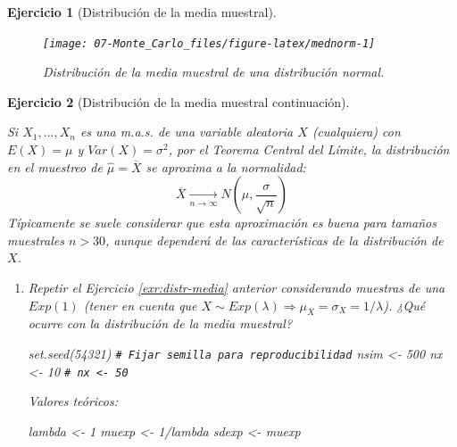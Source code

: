 \documentclass[
]{book}
\newenvironment{Shaded}{\begin{snugshade}}{\end{snugshade}}
\newcommand{\CommentTok}[1]{\textcolor[rgb]{0.56,0.35,0.01}{\textit{#1}}}
\newcommand{\DecValTok}[1]{\textcolor[rgb]{0.00,0.00,0.81}{#1}}
\newcommand{\FunctionTok}[1]{\textcolor[rgb]{0.00,0.00,0.00}{#1}}
\newcommand{\NormalTok}[1]{#1}
\newcommand{\OtherTok}[1]{\textcolor[rgb]{0.56,0.35,0.01}{#1}}
\newcommand{\SpecialCharTok}[1]{\textcolor[rgb]{0.00,0.00,0.00}{#1}}
\theoremstyle{break}
\newtheorem{exercise}{Ejercicio}[chapter]
\theoremstyle{nonumberplain}
\renewcommand{\CommentTok}[1]{\textcolor[rgb]{0.41,0.41,0.41}{\texttt{#1}}}
\begin{document}
\begin{exercise}[Distribución de la media muestral]
\begin{enumerate}
  \begin{figure}[!htb]

  {\centering \texttt{[image: 07-Monte\_Carlo\_files/figure-latex/mednorm-1]} 

  }

  \caption{Distribución de la media muestral de una distribución normal.}\label{fig:mednorm}
  \end{figure}
\end{enumerate}

\end{exercise}

\vspace{0.5cm}

\begin{exercise}[Distribución de la media muestral continuación]
\protect\hypertarget{exr:distr-mediab}{}\label{exr:distr-mediab}

Si \(X_{1},\ldots,X_{n}\) es una m.a.s. de una variable aleatoria
\(X\) (cualquiera) con \(E\left( X \right) = \mu\) y
\(Var\left( X \right) = \sigma^{2}\), por el Teorema Central del Límite,
la distribución en el muestreo de \(\hat{\mu}=\overline{X}\) se aproxima a la
normalidad:
\[\overline{X}\underset{n\rightarrow\infty}{\longrightarrow}
N\left( \mu, \dfrac{\sigma}{\sqrt{n}}\right)\]
Típicamente se suele considerar que esta aproximación es buena
para tamaños muestrales \(n>30\),
aunque dependerá de las características de la distribución de \(X\).

\begin{enumerate}
\def\labelenumi{\alph{enumi})}
\item
  Repetir el Ejercicio \ref{exr:distr-media} anterior considerando muestras de una \(Exp(1)\) (tener en cuenta que \(X\sim Exp(\lambda)\Rightarrow\mu_{X}=\sigma_{X}=1/\lambda\)).
  ¿Qué ocurre con la distribución de la media muestral?

\begin{Shaded}
\begin{Highlighting}[]
\FunctionTok{set.seed}\NormalTok{(}\DecValTok{54321}\NormalTok{) }\CommentTok{\# Fijar semilla para reproducibilidad}
\NormalTok{nsim }\OtherTok{\textless{}{-}} \DecValTok{500}
\NormalTok{nx }\OtherTok{\textless{}{-}} \DecValTok{10}    
\CommentTok{\# nx \textless{}{-} 50}
\end{Highlighting}
\end{Shaded}

  Valores teóricos:

\begin{Shaded}
\begin{Highlighting}[]
\NormalTok{lambda }\OtherTok{\textless{}{-}} \DecValTok{1}
\NormalTok{muexp }\OtherTok{\textless{}{-}} \DecValTok{1}\SpecialCharTok{/}\NormalTok{lambda}
\NormalTok{sdexp }\OtherTok{\textless{}{-}}\NormalTok{ muexp}
\end{Highlighting}
\end{Shaded}


\end{enumerate}
\end{exercise}
\end{document}
